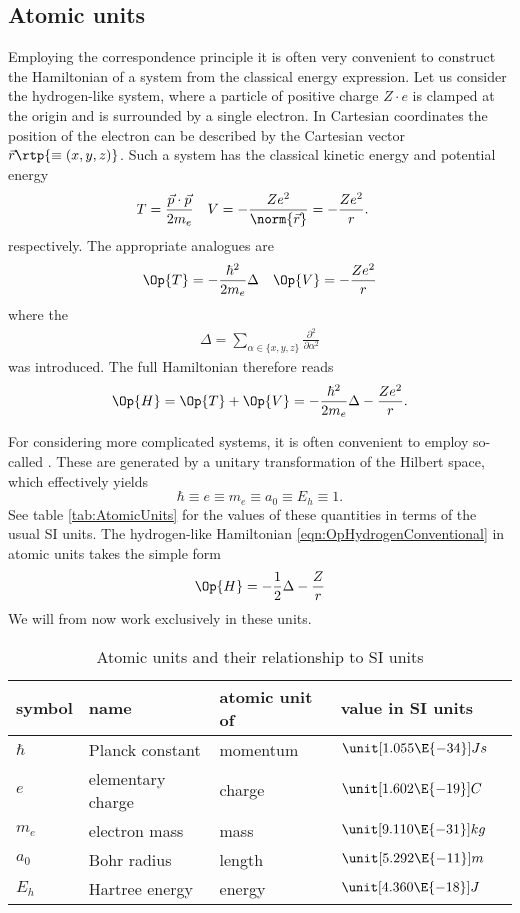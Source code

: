 \subsection{Atomic units}
Employing the correspondence principle it is often very convenient
to construct the \QM Hamiltonian of a system from the classical energy expression.
Let us consider the hydrogen-like system,
where a particle of positive charge $Z \cdot e$
is clamped at the origin and is surrounded by a single electron.
In Cartesian coordinates the position of the electron can be described by the Cartesian
vector $\vec{r} \rtp{\equiv (x, y, z)}$.
Such a system has the classical kinetic energy and potential energy
\begin{align*}
	T &= \frac{\vec{p} \cdot \vec{p}}{2 m_e} & V &= - \frac{Ze^2}{\norm{\vec{r}}} = - \frac{Ze^2}{r}.
\end{align*}
respectively. The appropriate \QM analogues are
\begin{align}
	\Op{T} &= -\frac{\hbar^2}{2 m_e} \Delta & \Op{V} = - \frac{Ze^2}{r}
	\label{eqn:OpHydrogenConventional}
\end{align}
where the 
\begin{align}
	\Delta = \sum_{\alpha \in \{x,y,z\}} \frac{\partial^2}{\partial \alpha^2}
	\label{eqn:LaplaceOperatorHydrogen}
\end{align}
was introduced. The full Hamiltonian therefore reads
\[ \Op{H} = \Op{T} + \Op{V} = -\frac{\hbar^2}{2 m_e} \Delta - \frac{Ze^2}{r}. \]

For considering more complicated systems,
it is often convenient to employ so-called .
These are generated by a unitary transformation of the Hilbert space,
which effectively yields
\[ \hbar \equiv e \equiv m_e \equiv a_0 \equiv E_h \equiv 1. \]
See table \vref{tab:AtomicUnits} for the values of these quantities
in terms of the usual SI units.
The hydrogen-like Hamiltonian \vref{eqn:OpHydrogenConventional}
in atomic units takes the simple form
\begin{equation}
	\Op{H} = -\frac12 \Delta - \frac{Z}{r}
	\label{eqn:OpHydrogen}
\end{equation}
We will from now work exclusively in these units.
\begin{table}
	\centering
	\begin{tabular}{lllll}
		\toprule
		symbol & name & atomic unit of & value in SI units \\
		\midrule
		$\hbar$ & Planck constant & momentum & $\unit[1.055\E{-34}]{Js}$ \\
		$e$ & elementary charge & charge & $\unit[1.602\E{-19}]{C}$ \\
		$m_e$ & electron mass & mass & $\unit[9.110\E{-31}]{kg}$ \\
		$a_0$ & Bohr radius & length & $\unit[5.292\E{-11}]{m}$ \\
		$E_h$ & Hartree energy & energy & $\unit[4.360\E{-18}]{J}$ \\
		\bottomrule
	\end{tabular}
	\caption{Atomic units and their relationship to SI units}
	\label{tab:AtomicUnits}
\end{table}
